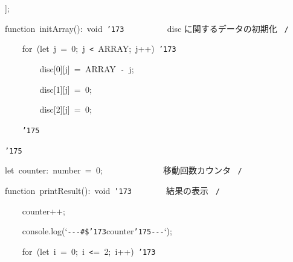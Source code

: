\documentclass[a4paper,10pt]{article}
\def\mc{\relax}
\begin{document}
\noindent
\mbox{}];

\noindent
\mbox{}\hfill

\noindent
\mbox{}function{\tt\mc \ }initArray():{\tt\mc \ }void{\tt\mc \ }{\tt\char'173}{\tt\mc \ }{\tt\mc \ }{\tt\mc \ }{\tt\mc \ }{\tt\mc \ }{\tt\mc \ }{\tt\mc \ }{\tt\mc \ }\rm\mc {\tt /}{\tt *}\  \ disc に関するデータの初期化 \hfill \rm\mc \ {\tt *}{\tt /}
\tt\mc 

\noindent
\mbox{}{\tt\mc \ }{\tt\mc \ }{\tt\mc \ }{\tt\mc \ }for{\tt\mc \ }(let{\tt\mc \ }j{\tt\mc \ }={\tt\mc \ }0;{\tt\mc \ }j{\tt\mc \ }{\tt <}{\tt\mc \ }ARRAY;{\tt\mc \ }j++){\tt\mc \ }{\tt\char'173}

\noindent
\mbox{}{\tt\mc \ }{\tt\mc \ }{\tt\mc \ }{\tt\mc \ }{\tt\mc \ }{\tt\mc \ }{\tt\mc \ }{\tt\mc \ }disc[0][j]{\tt\mc \ }={\tt\mc \ }ARRAY{\tt\mc \ }{\tt -}{\tt\mc \ }j;

\noindent
\mbox{}{\tt\mc \ }{\tt\mc \ }{\tt\mc \ }{\tt\mc \ }{\tt\mc \ }{\tt\mc \ }{\tt\mc \ }{\tt\mc \ }disc[1][j]{\tt\mc \ }={\tt\mc \ }0;

\noindent
\mbox{}{\tt\mc \ }{\tt\mc \ }{\tt\mc \ }{\tt\mc \ }{\tt\mc \ }{\tt\mc \ }{\tt\mc \ }{\tt\mc \ }disc[2][j]{\tt\mc \ }={\tt\mc \ }0;

\noindent
\mbox{}{\tt\mc \ }{\tt\mc \ }{\tt\mc \ }{\tt\mc \ }{\tt\char'175}

\noindent
\mbox{}{\tt\char'175}

\noindent
\mbox{}\hfill

\noindent
\mbox{}let{\tt\mc \ }counter:{\tt\mc \ }number{\tt\mc \ }={\tt\mc \ }0;{\tt\mc \ }{\tt\mc \ }{\tt\mc \ }{\tt\mc \ }{\tt\mc \ }{\tt\mc \ }{\tt\mc \ }{\tt\mc \ }{\tt\mc \ }{\tt\mc \ }{\tt\mc \ }{\tt\mc \ }\rm\mc {\tt /}{\tt *}\  \ 移動回数カウンタ \hfill \rm\mc \ {\tt *}{\tt /}
\tt\mc 

\noindent
\mbox{}\hfill

\noindent
\mbox{}function{\tt\mc \ }printResult():{\tt\mc \ }void{\tt\mc \ }{\tt\char'173}{\tt\mc \ }{\tt\mc \ }{\tt\mc \ }{\tt\mc \ }{\tt\mc \ }{\tt\mc \ }\rm\mc {\tt /}{\tt *}\  \ 結果の表示 \hfill \rm\mc \ {\tt *}{\tt /}
\tt\mc 

\noindent
\mbox{}{\tt\mc \ }{\tt\mc \ }{\tt\mc \ }{\tt\mc \ }counter++;

\noindent
\mbox{}{\tt\mc \ }{\tt\mc \ }{\tt\mc \ }{\tt\mc \ }console.log(`{\tt -}{\tt -}{\tt -}{\tt\#}{\tt\$}{\tt\char'173}counter{\tt\char'175}{\tt -}{\tt -}{\tt -}`);

\noindent
\mbox{}{\tt\mc \ }{\tt\mc \ }{\tt\mc \ }{\tt\mc \ }for{\tt\mc \ }(let{\tt\mc \ }i{\tt\mc \ }={\tt\mc \ }0;{\tt\mc \ }i{\tt\mc \ }{\tt <}={\tt\mc \ }2;{\tt\mc \ }i++){\tt\mc \ }{\tt\char'173}
\end{document}
